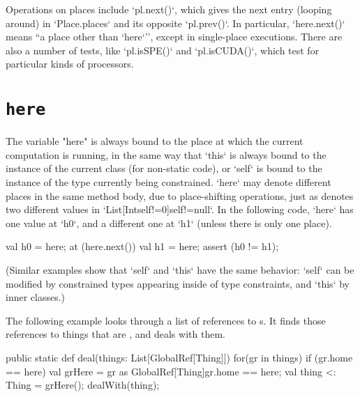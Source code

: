 Operations on places include \xcd`pl.next()`, which gives the next entry
(looping around) in \xcd`Place.places` and its opposite \xcd`pl.prev()`. In
particular, \xcd`here.next()` means ``a place other than \xcd`here`'', except
in single-place executions.
There are also a number of tests, like \xcd`pl.isSPE()` and 
\xcd`pl.isCUDA()`, which test for particular kinds of processors.




\section{{\tt here}}\label{Here}

The variable \xcd"here" is always bound to the place at which the current
computation is running, in the same way that \xcd`this` is always bound to the
instance of the current class (for non-static code), or \xcd`self` is bound to
the instance of the type currently being constrained.  
\xcd`here` may denote different places in the same method body, due to
place-shifting operations, just as  denotes 
two different values in \xcd`List[Int{self!=0}]{self!=null}`. In the following
code, \xcd`here` has one value at 
\xcd`h0`, and a different one at \xcd`h1` (unless there is only one place).
\begin{xten}
val h0 = here;
at (here.next()) {
  val h1 = here; 
  assert (h0 != h1);
}
\end{xten}
\noindent
(Similar examples show that \xcd`self` and \xcd`this` have the same behavior:
\xcd`self` can be modified by constrained types appearing inside of type
constraints, and \xcd`this` by inner classes.)



The following example looks through a list of references to s.  
It finds those references to things that are , and deals with them.  
\begin{xten}
  public static def deal(things: List[GlobalRef[Thing]]) {
     for(gr in things) {
        if (gr.home == here) {
           val grHere = 
               gr as GlobalRef[Thing]{gr.home == here};
           val thing <: Thing = grHere();
           dealWith(thing);
        }
     }
  }
\end{xten}



